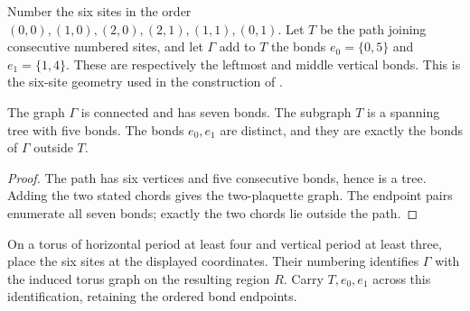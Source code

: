 \begin{definition}
    \label{def:peps_two_plaquette_graph}
    \leanok
    Number the six sites in the order
    $(0,0),(1,0),(2,0),(2,1),(1,1),(0,1)$.
    Let $T$ be the path joining consecutive numbered sites, and let
    $\Gamma$ add to $T$ the bonds $e_0=\{0,5\}$ and $e_1=\{1,4\}$.
    These are respectively the leftmost and middle vertical bonds.
    This is the six-site geometry used in the construction of
    \cite[proof of moving fluxons]{Schuch2010PEPS}.
\end{definition}

\begin{lemma}
    \label{thm:peps_two_plaquette_graph}
    \leanok
    The graph $\Gamma$ is connected and has seven bonds.
    The subgraph $T$ is a spanning tree with five bonds.
    The bonds $e_0,e_1$ are distinct, and they are exactly the
    bonds of $\Gamma$ outside $T$.
\end{lemma}
\begin{proof}\leanok
    The path has six vertices and five consecutive bonds, hence is a tree.
    Adding the two stated chords gives the two-plaquette graph.
    The endpoint pairs enumerate all seven bonds; exactly the two chords
    lie outside the path.
\end{proof}

\begin{definition}
    \label{def:peps_two_plaquette_torus_geometry}
    \leanok
    On a torus of horizontal period at least four and vertical period
    at least three, place the six sites at the displayed coordinates.
    Their numbering identifies $\Gamma$ with the induced torus
    graph on the resulting region $R$. Carry $T,e_0,e_1$ across this
    identification, retaining the ordered bond endpoints.
\end{definition}

